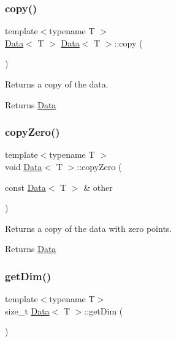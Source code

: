 \subsubsection{\texorpdfstring{copy()}{copy()}}
{\footnotesize\ttfamily template$<$typename T $>$ \\
\mbox{\hyperlink{class_data}{Data}}$<$ T $>$ \mbox{\hyperlink{class_data}{Data}}$<$ T $>$\+::copy (\begin{DoxyParamCaption}{ }\end{DoxyParamCaption})}



Returns a copy of the data. 

\begin{DoxyReturn}{Returns}
\mbox{\hyperlink{class_data}{Data}} 
\end{DoxyReturn}
\mbox{\label{class_data_ad94f8c8227a298b5cc0a862658f8cb99}} 
\subsubsection{\texorpdfstring{copy\+Zero()}{copyZero()}}
{\footnotesize\ttfamily template$<$typename T $>$ \\
void \mbox{\hyperlink{class_data}{Data}}$<$ T $>$\+::copy\+Zero (\begin{DoxyParamCaption}\item[{const \mbox{\hyperlink{class_data}{Data}}$<$ T $>$ \&}]{other }\end{DoxyParamCaption})}



Returns a copy of the data with zero points. 

\begin{DoxyReturn}{Returns}
\mbox{\hyperlink{class_data}{Data}} 
\end{DoxyReturn}
\mbox{\label{class_data_a87bdacb790f5a21966308c82b8be44d0}} 
\subsubsection{\texorpdfstring{get\+Dim()}{getDim()}}
{\footnotesize\ttfamily template$<$typename T$>$ \\
size\+\_\+t \mbox{\hyperlink{class_data}{Data}}$<$ T $>$\+::get\+Dim (\begin{DoxyParamCaption}{ }\end{DoxyParamCaption})\hspace{0.3cm}{\ttfamily [inline]}}




